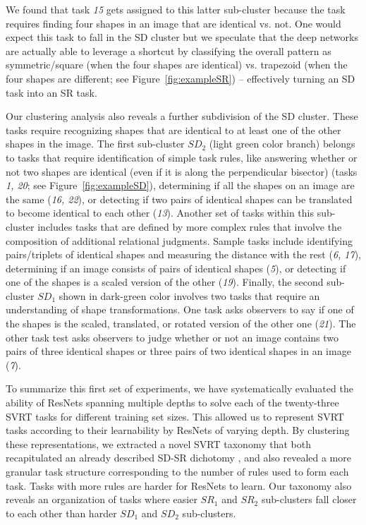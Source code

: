 We found that task \textit{15} gets assigned to this latter sub-cluster because the task requires finding four shapes in an image that are identical vs. not. One would expect this task to fall in the SD cluster but we speculate that the deep networks are actually able to leverage a shortcut \citep{geirhos2020shortcut} by classifying the overall pattern as symmetric/square (when the four shapes are identical) vs. trapezoid (when the four shapes are different; see Figure~\ref{fig:exampleSR}) -- effectively turning an SD task into an SR task. 


Our clustering analysis also reveals a further subdivision of the SD cluster. These tasks require recognizing shapes that are identical to at least one of the other shapes in the image. The first sub-cluster $SD_2$ (light green color branch) belongs to tasks that require identification of simple task rules, like answering whether or not two shapes are identical (even if it is along the perpendicular bisector) (tasks \textit{1, 20}; see Figure~\ref{fig:exampleSD}), determining if all the shapes on an image are the same (\textit{16, 22}), or detecting if two pairs of identical shapes can be translated to become identical to each other
(\textit{13}). Another set of tasks within this sub-cluster includes tasks that are defined by more complex rules that involve the composition of additional relational judgments. Sample tasks include identifying pairs/triplets of identical shapes and measuring the distance with the rest (\textit{6, 17}), determining if an image consists of pairs of identical shapes (\textit{5}), or detecting if one of the shapes is a scaled version of the other (\textit{19}). Finally, the second sub-cluster $SD_1$ shown in dark-green color involves two tasks that require an understanding of shape transformations. One task asks observers to say if one of the shapes is the scaled, translated, or rotated version of the other one (\textit{21}). The other task test asks observers to judge whether or not an image contains two pairs of three identical shapes or three pairs of two identical shapes in an image (\textit{7}).  

To summarize this first set of experiments, we have systematically evaluated the ability of ResNets spanning multiple depths to solve each of the twenty-three SVRT tasks for different training set sizes. This allowed us to represent SVRT tasks according to their learnability by ResNets of varying depth. By clustering these representations, we extracted a novel SVRT taxonomy that both recapitulated an already described SD-SR dichotomy \citep{kim2018not}, and also revealed a more granular task structure corresponding to the number of rules used to form each task. Tasks with more rules are harder for ResNets to learn. Our taxonomy also reveals an organization of tasks where easier $SR_1$ and $SR_2$ sub-clusters fall closer to each other than harder $SD_1$ and $SD_2$ sub-clusters.

